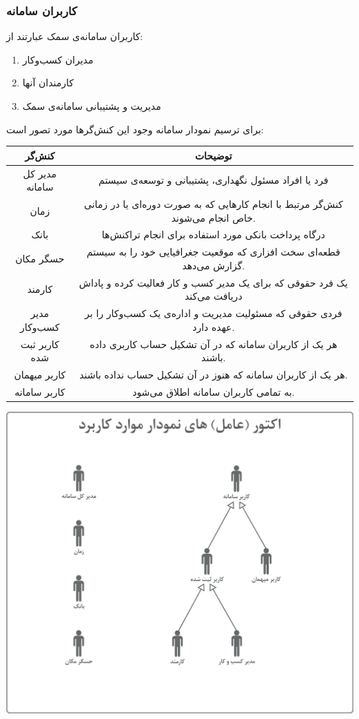 \subsubsection{کاربران سامانه}
کاربران سامانه‌ی سمک عبارتند از:
\begin{enumerate}
\item مدیران کسب‌وکار
\item کارمندان آنها
\item مدیریت و پشتیبانی سامانه‌ی سمک
\end{enumerate}

برای ترسیم نمودار  سامانه وجود این کنش‌گر‌ها مورد تصور است:
\begin{center}
\begin{tabular}{|c|c|}
\hline
\rowcolor{black!30}
کنش‌گر
&
توضیحات
\\ \hline
مدیر کل سامانه
&
فرد یا افراد مسئول نگهداری، پشتیبانی و توسعه‌ی سیستم
 \\ \hline

زمان
&
کنش‌گر مرتبط با انجام کار‌هایی که به صورت دوره‌ای یا در زمانی خاص انجام می‌شوند.
 \\ \hline
بانک
&
درگاه پرداخت بانکی مورد استفاده برای انجام تراکنش‌ها
 \\ \hline
حسگر مکان
&
قطعه‌ای سخت افزاری که موقعیت جغرافیایی خود را به سیستم گزارش می‌دهد.
 \\ \hline
کارمند
&
یک فرد حقوقی که برای یک مدیر کسب و کار فعالیت کرده و پاداش دریافت می‌کند
 \\ \hline
مدیر کسب‌وکار
&
فردی حقوقی که مسئولیت مدیریت و اداره‌ی یک کسب‌و‌کار را بر عهده دارد.
 \\ \hline
کاربر ثبت شده
&
هر یک از کاربران سامانه که در آن تشکیل حساب کاربری داده باشند.
 \\ \hline
کاربر میهمان
&
هر یک از کاربران سامانه که هنوز در آن تشکیل حساب نداده باشند.
 \\ \hline
کاربر سامانه
&
به تمامی کاربران سامانه اطلاق می‌شود.
 \\ \hline
	
\end{tabular}
\end{center}
\includegraphics[width = \textwidth]{images/actors}
